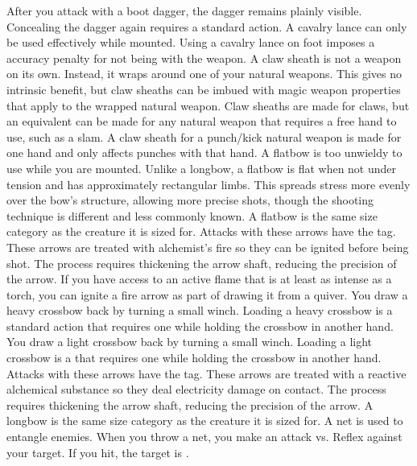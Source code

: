     After you attack with a boot dagger, the dagger remains plainly visible.
    Concealing the dagger again requires a standard action.
     A cavalry lance can only be used effectively while mounted.
    Using a cavalry lance on foot imposes a  accuracy penalty for not being  with the weapon.
     A claw sheath is not a weapon on its own.
    Instead, it wraps around one of your natural weapons.
    This gives no intrinsic benefit, but claw sheaths can be imbued with magic weapon properties that apply to the wrapped natural weapon.
    Claw sheaths are made for claws, but an equivalent can be made for any natural weapon that requires a free hand to use, such as a slam.
    A claw sheath for a punch/kick natural weapon is made for one hand and only affects punches with that hand.
     A flatbow is too unwieldy to use while you are mounted.
    Unlike a longbow, a flatbow is flat when not under tension and has approximately rectangular limbs.
    This spreads stress more evenly over the bow's structure, allowing more precise shots, though the shooting technique is different and less commonly known.
    A flatbow is the same size category as the creature it is sized for.
     Attacks with these arrows have the \atFire tag.
    These arrows are treated with alchemist's fire so they can be ignited before being shot.
    The process requires thickening the arrow shaft, reducing the precision of the arrow.
    If you have access to an active flame that is at least as intense as a torch, you can ignite a fire arrow as part of drawing it from a quiver.
     You draw a heavy crossbow back by turning a small winch.
    Loading a heavy crossbow is a standard action that requires one  while holding the crossbow in another hand.
     You draw a light crossbow back by turning a small winch.
    Loading a light crossbow is a  that requires one  while holding the crossbow in another hand.
     Attacks with these arrows have the \atElectricity tag.
    These arrows are treated with a reactive alchemical substance so they deal electricity damage on contact.
    The process requires thickening the arrow shaft, reducing the precision of the arrow.
     A longbow is the same size category as the creature it is sized for.
     A net is used to entangle enemies. When you throw a net, you make an attack vs. Reflex against your target. If you hit, the target is \slowed.
